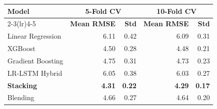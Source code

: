 \begin{tabular}{@{}lrrrr@{}}
\toprule
\textbf{Model} & \multicolumn{2}{c}{\textbf{5-Fold CV}} & \multicolumn{2}{c}{\textbf{10-Fold CV}} \\
\cmidrule(lr){2-3}\cmidrule(lr){4-5}
 & \textbf{Mean RMSE} & \textbf{Std} & \textbf{Mean RMSE} & \textbf{Std} \\
\midrule
Linear Regression & 6.11 & 0.42 & 6.09 & 0.31 \\
XGBoost & 4.50 & 0.28 & 4.48 & 0.21 \\
Gradient Boosting & 4.75 & 0.31 & 4.73 & 0.23 \\
LR-LSTM Hybrid & 6.05 & 0.38 & 6.03 & 0.27 \\
\textbf{Stacking} & \textbf{4.31} & \textbf{0.22} & \textbf{4.29} & \textbf{0.17} \\
Blending & 4.66 & 0.27 & 4.64 & 0.20 \\
\bottomrule
\end{tabular}
